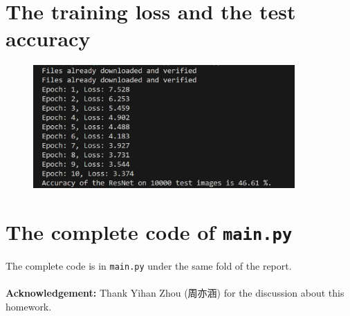 \documentclass{article}
\newcommand{\Acknowledgement}[1]{\ \\{\bf Acknowledgement:} #1}
\begin{document}
\begin{spacing}{1.1}
\section{The training loss and the test accuracy}
\begin{figure}[htbp]
  \centering
  \includegraphics*[width=10cm]{loss.png}
\end{figure}


\section{The complete code of \texttt{main.py}}
The complete code is in \texttt{main.py} under the same fold of the report.
\\
\Acknowledgement{Thank Yihan Zhou (周亦涵) for
the discussion about this homework.}


\end{spacing}
\end{document}
